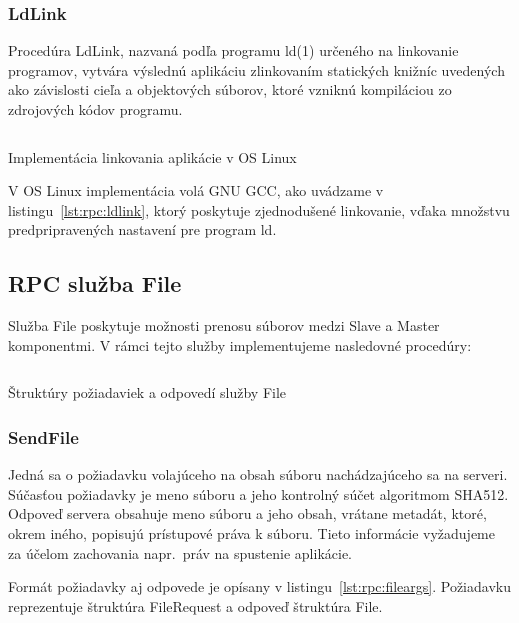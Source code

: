 \subsubsection{LdLink}

Procedúra LdLink, nazvaná podľa programu ld(1) určeného na linkovanie programov,
vytvára výslednú aplikáciu zlinkovaním statických knižníc uvedených ako závislosti
cieľa a objektových súborov, ktoré vzniknú kompiláciou zo zdrojových kódov programu.

\begin{listing}[H]
  \inputminted[frame=lines,framesep=2mm,linenos,fontsize=\scriptsize,firstline=74,lastline=97]{go}{/home/pepol/src/imterra/forge/worker/tasks/tasks.go}
  \caption{Implementácia linkovania aplikácie v OS Linux}
  \label{lst:rpc:ldlink}
\end{listing}

V OS Linux implementácia volá GNU GCC\@, ako uvádzame v listingu~\ref{lst:rpc:ldlink}, ktorý
poskytuje zjednodušené linkovanie, vďaka množstvu predpripravených nastavení pre program
ld.

\subsection{RPC služba File}
\label{sec:slave:rpc:file}

Služba File poskytuje možnosti prenosu súborov medzi Slave a Master komponentmi.
V rámci tejto služby implementujeme nasledovné procedúry:

\begin{listing}[h]
  \inputminted[frame=lines,framesep=2mm,linenos,fontsize=\scriptsize,firstline=7,lastline=21]{go}{/home/pepol/src/imterra/forge/proto/files.go}
  \caption{Štruktúry požiadaviek a odpovedí služby File}
  \label{lst:rpc:fileargs}
\end{listing}


\subsubsection{SendFile}

Jedná sa o požiadavku volajúceho na obsah súboru nachádzajúceho sa na serveri.
Súčasťou požiadavky je meno súboru a jeho kontrolný súčet algoritmom SHA512.
Odpoveď servera obsahuje meno súboru a jeho obsah, vrátane metadát, ktoré, okrem
iného, popisujú prístupové práva k súboru. Tieto informácie vyžadujeme za účelom
zachovania napr.\ práv na spustenie aplikácie.

Formát požiadavky aj odpovede je opísany v listingu~\ref{lst:rpc:fileargs}.
Požiadavku reprezentuje štruktúra FileRequest a odpoveď štruktúra File.

